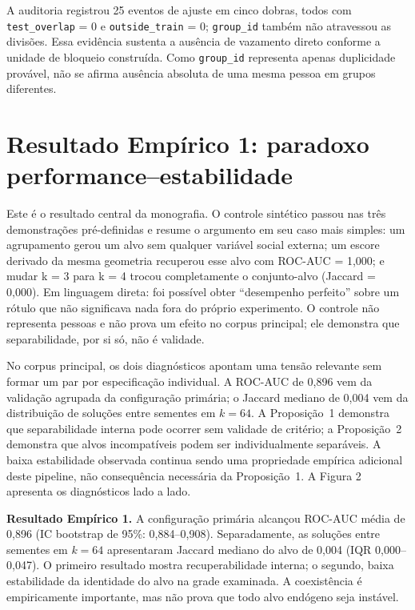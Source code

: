 A auditoria registrou 25 eventos de ajuste em cinco dobras, todos com \texttt{test\_overlap} = 0 e \texttt{outside\_train} = 0; \texttt{group\_id} também não atravessou as divisões. Essa evidência sustenta a ausência de vazamento direto conforme a unidade de bloqueio construída. Como \texttt{group\_id} representa apenas duplicidade provável, não se afirma ausência absoluta de uma mesma pessoa em grupos diferentes.

\section{Resultado Empírico 1: paradoxo performance--estabilidade}

Este é o resultado central da monografia. O controle sintético passou nas três demonstrações pré-definidas e resume o argumento em seu caso mais simples: um agrupamento gerou um alvo sem qualquer variável social externa; um escore derivado da mesma geometria recuperou esse alvo com ROC-AUC = 1,000; e mudar k = 3 para k = 4 trocou completamente o conjunto-alvo (Jaccard = 0,000). Em linguagem direta: foi possível obter ``desempenho perfeito'' sobre um rótulo que não significava nada fora do próprio experimento. O controle não representa pessoas e não prova um efeito no corpus principal; ele demonstra que separabilidade, por si só, não é validade.

No corpus principal, os dois diagnósticos apontam uma tensão relevante sem formar um par por especificação individual. A ROC-AUC de 0,896 vem da validação agrupada da configuração primária; o Jaccard mediano de 0,004 vem da distribuição de soluções entre sementes em $k=64$. A Proposição~1 demonstra que separabilidade interna pode ocorrer sem validade de critério; a Proposição~2 demonstra que alvos incompatíveis podem ser individualmente separáveis. A baixa estabilidade observada continua sendo uma propriedade empírica adicional deste pipeline, não consequência necessária da Proposição~1. A Figura 2 apresenta os diagnósticos lado a lado.

\begin{boxtext}\textbf{Resultado Empírico 1.} A configuração primária alcançou ROC-AUC média de 0,896 (IC bootstrap de 95\%: 0,884--0,908). Separadamente, as soluções entre sementes em $k=64$ apresentaram Jaccard mediano do alvo de 0,004 (IQR 0,000--0,047). O primeiro resultado mostra recuperabilidade interna; o segundo, baixa estabilidade da identidade do alvo na grade examinada. A coexistência é empiricamente importante, mas não prova que todo alvo endógeno seja instável.\end{boxtext}

